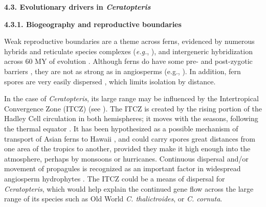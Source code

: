\documentclass[12pt]{article}
\begin{document}
\begin{flushleft}
{\textbf{4.3. Evolutionary drivers in \textit{Ceratopteris}}}

\textbf{4.3.1. Biogeography and reproductive boundaries}

Weak reproductive boundaries are a theme across ferns, evidenced by numerous hybrids and reticulate species complexes (\emph{e.g.}, \cite{Barrington1989,  Paris1989, Sessa2012a, Sigel2016, Yatabe2009}), and intergeneric hybridization across 60 MY of evolution \autocite{Rothfels2015}. Although ferns do have some pre- and post-zygotic barriers \autocite{Haufler2016}, they are not as strong as in angiosperms (e.g., \cite{De_Nettancourt1997, Lafon-Placette2016}). In addition, fern spores are very easily dispersed \autocite{Tryon1970, Smith1972}, which limits isolation by distance. 

In the case of \textit{Ceratopteris}, its large range may be influenced by the Intertropical Convergence Zone (ITCZ) (see \cite{Dettmann1992, LloydTax1974, Schneider2014}). The ITCZ is created by the rising portion of the Hadley Cell circulation in both hemispheres; it moves with the seasons, following the thermal equator \autocite{Schneider2014}. It has been hypothesized as a possible mechanism of transport of Asian ferns to Hawaii \autocite{Geiger2007}, and could carry spores great distances from one area of the tropics to another, provided they make it high enough into the atmosphere, perhaps by monsoons or hurricanes. Continuous dispersal and/or movement of propagules is recognized as an important factor in widespread angiosperm hydrophytes \autocite{Les2003, Spalik2014}. The ITCZ could be a means of dispersal for \textit{Ceratopteris}, which would help explain the continued gene flow across the large range of its species such as Old World \textit{C. thalictroides}, or \textit{C. cornuta}. 


\end{flushleft}
\end{document}
